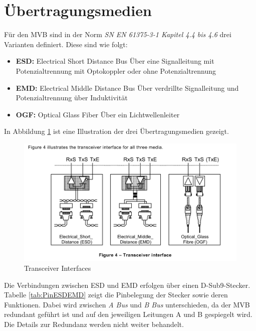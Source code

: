 \section{Übertragungsmedien}
\label{Übertragungsmedien}

Für den MVB sind in der Norm \textit{SN EN 61375-3-1 Kapitel 4.4 bis 4.6 } drei Varianten definiert. Diese sind wie folgt:
\begin{itemize}
    \item \textbf{ESD:} Electrical Short Distance Bus
    Über eine Signalleitung mit Potenzialtrennung mit Optokoppler oder ohne Potenzialtrennung
    \item  \textbf{EMD:} Electrical Middle Distance Bus
    Über verdrillte Signalleitung und Potenzialtrennung über Induktivität
    \item  \textbf{OGF:} Optical Glass Fiber
    Über ein Lichtwellenleiter
\end{itemize}

In Abbildung \ref{fig:TransceiverInterface} ist eine Illustration der drei Übertragungsmedien gezeigt. 

\begin{figure}[H]
    \centering
    \includegraphics[width=0.9\linewidth]{Figures/Chap2/Grundlagen/MVB_DOKU/EMD_ESD_OGF/Fig4_Transceiver interface.png}
    \caption{Transceiver Interfaces}
    \label{fig:TransceiverInterface}
\end{figure}

Die Verbindungen zwischen ESD und EMD erfolgen über einen D-Sub9-Stecker. Tabelle \ref{tab:PinESDEMD} zeigt die Pinbelegung der Stecker sowie deren Funktionen. Dabei wird zwischen \textit{A Bus} und \textit{B Bus} unterschieden, da der MVB redundant geführt ist und auf den jeweiligen Leitungen A und B gespiegelt wird. Die Details zur Redundanz werden nicht weiter behandelt.


